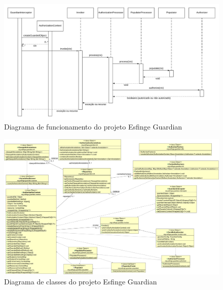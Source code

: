 \begin{landscape}

    \begin{figure}
        \centering
        \includegraphics[scale=0.2]{src/imagens/cap2/sequencia-guardian.png}
        \caption{Diagrama de funcionamento do projeto Esfinge Guardian}
        \label{fig:diagrama-funcionamento-guardian}
    \end{figure}

    \begin{figure}
        \centering
        \includegraphics[scale=0.28]{src/imagens/cap2/guardian-core-class-diagram.png}
        \caption{Diagrama de classes do projeto Esfinge Guardian}
        \label{fig:guardian-diagrama-classe-cap2}
    \end{figure}
\end{landscape}
